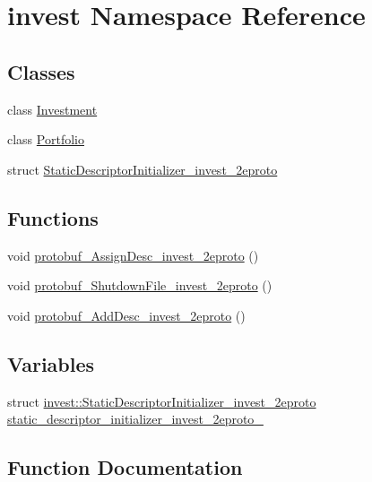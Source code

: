 \hypertarget{namespaceinvest}{}\section{invest Namespace Reference}
\label{namespaceinvest}
\subsection*{Classes}
\begin{DoxyCompactItemize}
\item 
class \hyperlink{classinvest_1_1_investment}{Investment}
\item 
class \hyperlink{classinvest_1_1_portfolio}{Portfolio}
\item 
struct \hyperlink{structinvest_1_1_static_descriptor_initializer__invest__2eproto}{Static\+Descriptor\+Initializer\+\_\+invest\+\_\+2eproto}
\end{DoxyCompactItemize}
\subsection*{Functions}
\begin{DoxyCompactItemize}
\item 
void \hyperlink{namespaceinvest_a2acb07c50ba030781de4c2c86fe92f35}{protobuf\+\_\+\+Assign\+Desc\+\_\+invest\+\_\+2eproto} ()
\item 
void \hyperlink{namespaceinvest_a783ced3d5b66e4bdc473093210cd535f}{protobuf\+\_\+\+Shutdown\+File\+\_\+invest\+\_\+2eproto} ()
\item 
void \hyperlink{namespaceinvest_a3d50cd2ec85d9645022c8602afda271d}{protobuf\+\_\+\+Add\+Desc\+\_\+invest\+\_\+2eproto} ()
\end{DoxyCompactItemize}
\subsection*{Variables}
\begin{DoxyCompactItemize}
\item 
struct \hyperlink{structinvest_1_1_static_descriptor_initializer__invest__2eproto}{invest\+::\+Static\+Descriptor\+Initializer\+\_\+invest\+\_\+2eproto} \hyperlink{namespaceinvest_aead490f575ec94fd746c85216615948d}{static\+\_\+descriptor\+\_\+initializer\+\_\+invest\+\_\+2eproto\+\_\+}
\end{DoxyCompactItemize}


\subsection{Function Documentation}
\hypertarget{namespaceinvest_a3d50cd2ec85d9645022c8602afda271d}{}
